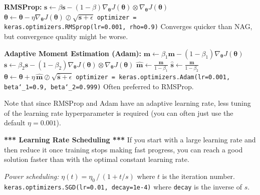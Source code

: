 \textbf{RMSProp:}\newline
$\boldsymbol{s} \leftarrow \beta \boldsymbol{s} - (1 - \beta) \nabla_{\boldsymbol{\theta}} J (\boldsymbol{\theta}) \otimes \nabla_{\boldsymbol{\theta}} J (\boldsymbol{\theta})$\newline
$\boldsymbol{\theta} \leftarrow \boldsymbol{\theta} - \eta  \nabla_{\boldsymbol{\theta}} J (\boldsymbol{\theta}) \oslash \sqrt{\boldsymbol{s} + \epsilon} $\newline
\texttt{optimizer = keras.optimizers.RMSprop(lr=0.001, rho=0.9)}\newline
Converges quicker than NAG, but convergence quality might be worse.\newline

\textbf{Adaptive Moment Estimation (Adam):}\newline
$\boldsymbol{m} \leftarrow \beta_1 \boldsymbol{m} - (1 - \beta_1) \nabla_{\boldsymbol{\theta}} J (\boldsymbol{\theta})$\newline
$\boldsymbol{s} \leftarrow \beta_2 \boldsymbol{s} - (1 - \beta_2) \nabla_{\boldsymbol{\theta}} J (\boldsymbol{\theta}) \otimes \nabla_{\boldsymbol{\theta}} J (\boldsymbol{\theta})$\newline
$\widehat{\boldsymbol{m}} \leftarrow \frac{\boldsymbol{m}}{1-\beta_1}$\newline
$\widehat{\boldsymbol{s}} \leftarrow \frac{\boldsymbol{m}}{1-\beta_2}$\newline
$\boldsymbol{\theta} \leftarrow \boldsymbol{\theta} + \eta \, \widehat{\boldsymbol{m}} \oslash \sqrt{\widehat{\boldsymbol{s}} + \epsilon}$\newline
\texttt{optimizer = keras.optimizers.Adam(lr=0.001, beta\char`_1=0.9, beta\char`_2=0.999)}\newline
Often preferred to RMSProp.

Note that since RMSProp and Adam have an adaptive learning rate,
less tuning of the learning rate hyperparameter is required (you can often just use the default $\eta=0.001$).\newline

\textbf{*** Learning Rate Scheduling ***}\newline
If you start with a large learning rate and then reduce it once training stops making fast progress,
you can reach a good solution faster than with the optimal constant learning rate.

\textit{Power scheduling:} $\eta(t) = \eta_0 \, / \, (1 + t/s)$ where $t$ is the iteration number.\newline
\texttt{keras.optimizers.SGD(lr=0.01, decay=1e-4)} where \texttt{decay} is the inverse of $s$.\newline

